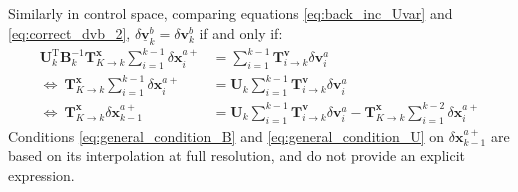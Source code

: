 \documentclass[12pt]{scrartcl}
\begin{document}
Similarly in control space, comparing equations \eqref{eq:back_inc_Uvar} and \eqref{eq:correct_dvb_2}, $\delta \underline{\mathbf{v}}^b_k = \delta \mathbf{v}^b_k$ if and only if:
\begin{align}
\label{eq:general_condition_U}
\mathbf{U}_k^\mathrm{T} \mathbf{B}^{-1}_k \mathbf{T}^\mathbf{x}_{K \rightarrow k} \sum_{i=1}^{k-1} \delta \mathbf{x}^{a+}_i & = \sum_{i=1}^{k-1} \mathbf{T}^\mathbf{v}_{i \rightarrow k} \delta \mathbf{v}^a_i \nonumber \\
\Leftrightarrow \ \mathbf{T}^\mathbf{x}_{K \rightarrow k} \sum_{i=1}^{k-1} \delta \mathbf{x}^{a+}_i & = \mathbf{U}_k \sum_{i=1}^{k-1} \mathbf{T}^\mathbf{v}_{i \rightarrow k} \delta \mathbf{v}^a_i \nonumber \\
\Leftrightarrow \ \mathbf{T}^\mathbf{x}_{K \rightarrow k} \delta \mathbf{x}^{a+}_{k-1} & = \mathbf{U}_k \sum_{i=1}^{k-1} \mathbf{T}^\mathbf{v}_{i \rightarrow k} \delta \mathbf{v}^a_i - \mathbf{T}^\mathbf{x}_{K \rightarrow k} \sum_{i=1}^{k-2} \delta \mathbf{x}^{a+}_i
\end{align}
Conditions \eqref{eq:general_condition_B} and \eqref{eq:general_condition_U} on $\delta \mathbf{x}^{a+}_{k-1}$ are based on its interpolation at full resolution, and do not provide an explicit expression.
\end{document}
